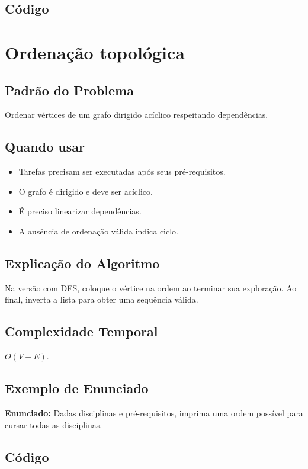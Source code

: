 \subsection{Código}

\section{Ordenação topológica}

\subsection{Padrão do Problema}
Ordenar vértices de um grafo dirigido acíclico respeitando dependências.

\subsection{Quando usar}
\begin{itemize}[nosep]
  \item Tarefas precisam ser executadas após seus pré-requisitos.
  \item O grafo é dirigido e deve ser acíclico.
  \item É preciso linearizar dependências.
  \item A ausência de ordenação válida indica ciclo.
\end{itemize}

\subsection{Explicação do Algoritmo}
Na versão com DFS, coloque o vértice na ordem ao terminar sua exploração. Ao final, inverta a lista para obter uma sequência válida.

\subsection{Complexidade Temporal}
$O(V + E)$.

\subsection{Exemplo de Enunciado}
\begin{exemplodiabox}
\textbf{Enunciado:} Dadas disciplinas e pré-requisitos, imprima uma ordem possível para cursar todas as disciplinas.
\end{exemplodiabox}

\subsection{Código}

